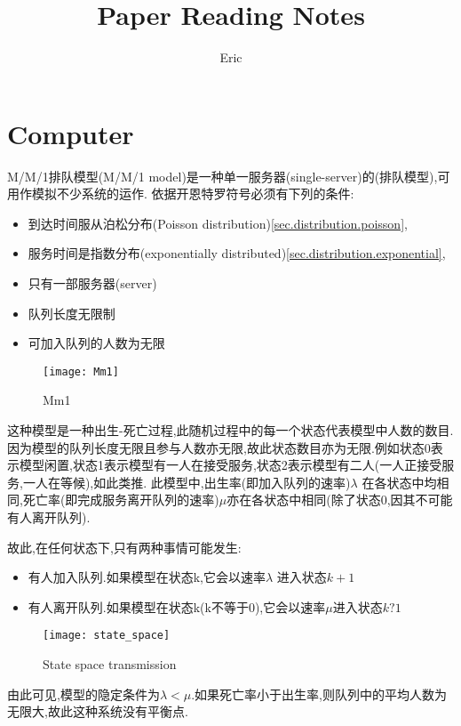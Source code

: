 \documentclass[openany]{book}
\begin{document}
\title{Paper Reading Notes}
\author{Eric}
\maketitle
\tableofcontents
\frontmatter

\part{Computer}
M/M/1排队模型(M/M/1 model)是一种单一服务器(single-server)的(排队模型),可用作模拟不少系统的运作.
依据开恩特罗符号必须有下列的条件:
\begin{itemize}
\item 到达时间服从泊松分布(Poisson distribution)\ref{sec.distribution.poisson},
\item 服务时间是指数分布(exponentially distributed)\ref{sec.distribution.exponential},
\item 只有一部服务器(server)
\item 队列长度无限制
\item 可加入队列的人数为无限
\end{itemize}
\begin{figure}[htbp]
  \centering
  \texttt{[image: Mm1]}\\
  \caption{Mm1}\label{fig.Mm1}
\end{figure}

这种模型是一种出生-死亡过程,此随机过程中的每一个状态代表模型中人数的数目.因为模型的队列长度无限且参与人数亦无限,故此状态数目亦为无限.例如状态0表示模型闲置,状态1表示模型有一人在接受服务,状态2表示模型有二人(一人正接受服务,一人在等候),如此类推. 此模型中,出生率(即加入队列的速率)$\lambda$ 在各状态中均相同,死亡率(即完成服务离开队列的速率)$\mu$亦在各状态中相同(除了状态0,因其不可能有人离开队列).

故此,在任何状态下,只有两种事情可能发生:
\begin{itemize}
\item 有人加入队列.如果模型在状态k,它会以速率$\lambda$ 进入状态$k + 1$
\item 有人离开队列.如果模型在状态k(k不等于0),它会以速率$\mu$进入状态$k ? 1$
\end{itemize}
\begin{figure}[htbp]
  \centering
  \texttt{[image: state\_space]}\\
  \caption{State space transmission}\label{fig.state_space}
\end{figure}

由此可见,模型的隐定条件为$\lambda < \mu$.如果死亡率小于出生率,则队列中的平均人数为无限大,故此这种系统没有平衡点.
\end{document}
